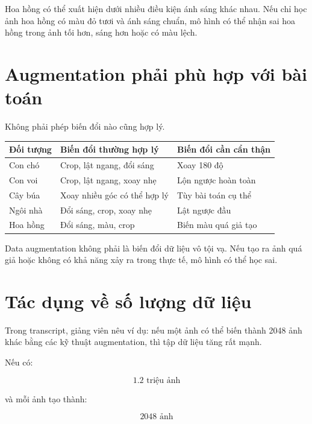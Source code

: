 \documentclass[12pt,a4paper]{report}
\begin{document}
\begin{vidu}
Hoa hồng có thể xuất hiện dưới nhiều điều kiện ánh sáng khác nhau. Nếu chỉ học ảnh hoa hồng có màu đỏ tươi và ánh sáng chuẩn, mô hình có thể nhận sai hoa hồng trong ảnh tối hơn, sáng hơn hoặc có màu lệch.
\end{vidu}

\section{Augmentation phải phù hợp với bài toán}

Không phải phép biến đổi nào cũng hợp lý.

\begin{center}
\begin{tabular}{p{}p{}p{}}
\toprule
Đối tượng & Biến đổi thường hợp lý & Biến đổi cần cẩn thận \\
\midrule
Con chó & Crop, lật ngang, đổi sáng & Xoay 180 độ \\
Con voi & Crop, lật ngang, xoay nhẹ & Lộn ngược hoàn toàn \\
Cây búa & Xoay nhiều góc có thể hợp lý & Tùy bài toán cụ thể \\
Ngôi nhà & Đổi sáng, crop, xoay nhẹ & Lật ngược đầu \\
Hoa hồng & Đổi sáng, màu, crop & Biến màu quá giả tạo \\
\bottomrule
\end{tabular}
\end{center}

\begin{canhbao}
Data augmentation không phải là biến đổi dữ liệu vô tội vạ. Nếu tạo ra ảnh quá giả hoặc không có khả năng xảy ra trong thực tế, mô hình có thể học sai.
\end{canhbao}

\section{Tác dụng về số lượng dữ liệu}

Trong transcript, giảng viên nêu ví dụ: nếu một ảnh có thể biến thành 2048 ảnh khác bằng các kỹ thuật augmentation, thì tập dữ liệu tăng rất mạnh.

Nếu có:

\[
    1.2 \text{ triệu ảnh}
\]

và mỗi ảnh tạo thành:

\[
    2048 \text{ ảnh}
\]
\end{document}
